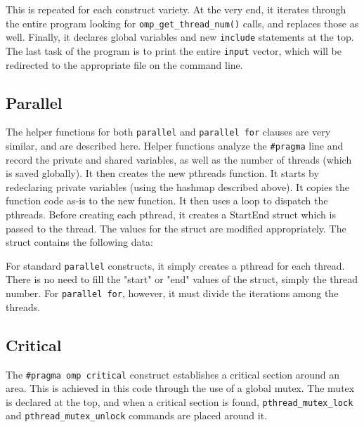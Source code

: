 \documentclass[]{article}
\begin{document}
This is repeated for each construct variety. At the very end, it iterates through the entire program looking for \texttt{omp\_get\_thread\_num()} calls, and replaces those as well. Finally, it declares global variables and new \texttt{include} statements at the top. The last task of the program is to print the entire \texttt{input} vector, which will be redirected to the appropriate file on the command line.

\subsection{Parallel}
The helper functions for both \texttt{parallel} and \texttt{parallel for} clauses are very similar, and are described here. Helper functions analyze the \texttt{\#pragma} line and record the private and shared variables, as well as the number of threads (which is saved globally). It then creates the new pthreads function. It starts by redeclaring private variables (using the hashmap described above). It copies the function code as-is to the new function. It then uses a loop to dispatch the pthreads.
\newline \newline
Before creating each pthread, it creates a StartEnd struct which is passed to the thread. The values for the struct are modified appropriately. The struct contains the following data:
\newline


For standard \texttt{parallel} constructs, it simply creates a pthread for each thread. There is no need to fill the "start" or "end" values of the struct, simply the thread number. For \texttt{parallel for}, however, it must divide the iterations among the threads.

\subsection{Critical}
The \texttt{\#pragma omp critical} construct establishes a critical section around an area. This is achieved in this code through the use of a global mutex. The mutex is declared at the top, and when a critical section is found, \texttt{pthread\_mutex\_lock} and \texttt{pthread\_mutex\_unlock} commands are placed around it.
\end{document}
